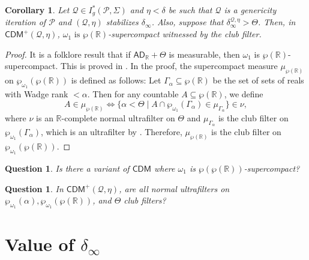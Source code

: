 \documentclass{amsart}
\newtheorem{cor}[dfn]{Corollary}
\newtheorem{ques}[dfn]{Question}
\renewcommand{\subset}{\subseteq}
\newcommand{\power}{\wp}
\begin{document}
\begin{cor}\label{P(R)-supercompactness}
    Let $\mathcal{Q}\in I^*_g(\mathcal{P}, \Sigma)$ and $\eta<\delta$ be such that $\mathcal{Q}$ is a genericity iteration of $\mathcal{P}$ and $(\mathcal{Q}, \eta)$ stabilizes $\delta_{\infty}$.
    Also, suppose that $\delta^{\mathcal{Q}, \eta}_{\infty}>\Theta$.
    Then, in $\mathsf{CDM}^+(\mathcal{Q}, \eta)$, $\omega_1\text{ is }\power(\mathbb{R})$-supercompact witnessed by the club filter.
\end{cor}
\begin{proof}
    It is a folklore result that if $\mathsf{AD}_{\mathbb{R}}+\Theta$ is measurable, then $\omega_1$ is $\power(\mathbb{R})$-supercompact.
    This is proved in \cite[Theorem 3.1]{Tr15MALQ}.
    In the proof, the supercompact measure $\mu_{\power(\mathbb{R})}$ on $\power_{\omega_1}(\power(\mathbb{R}))$ is defined as follows: Let $\Gamma_{\alpha}\subset\power(\mathbb{R})$ be the set of sets of reals with Wadge rank $<\alpha$.
    Then for any countable $A\subset\power(\mathbb{R})$, we define
    \[
    A\in\mu_{\power(\mathbb{R})}\iff\{\alpha<\Theta\mid A\cap\power_{\omega_1}(\Gamma_{\alpha})\in\mu_{\Gamma_{\alpha}}\}\in\nu,
    \]
    where $\nu$ is an $\mathbb{R}$-complete normal ultrafilter on $\Theta$ and $\mu_{\Gamma_{\alpha}}$ is the club filter on $\power_{\omega_1}(\Gamma_{\alpha})$, which is an ultrafilter by \cite{Wo20}.
    Therefore, $\mu_{\power(\mathbb{R})}$ is the club filter on $\power_{\omega_1}(\power(\mathbb{R}))$.
\end{proof}

\begin{ques}
    Is there a variant of $\mathsf{CDM}$ where $\omega_1$ is $\power(\power(\mathbb{R}))$-supercompact?
\end{ques}

\begin{ques}
    In $\mathsf{CDM}^+(\mathcal{Q}, \eta)$, are all normal ultrafilters on $\power_{\omega_1}(\alpha), \power_{\omega_1}(\power(\mathbb{R}))$, and $\Theta$ club filters?
\end{ques}

\section{Value of $\delta_{\infty}$}
\end{document}
